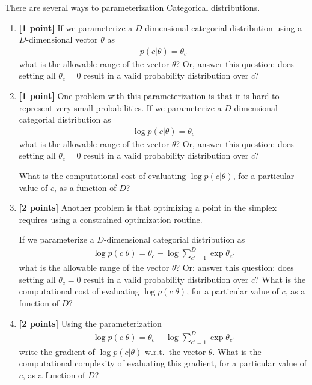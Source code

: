 \documentclass{harvardml}
\theoremstyle{plain}
\begin{document}
\begin{problem}

There are several ways to parameterization Categorical distributions.

\begin{enumerate}[label=(\alph*)]
\item {\bf [1 point]} If we parameterize a $D$-dimensional categorial distribution using a $D$-dimensional vector $\theta$ as
%
\begin{align}
p(c | \theta) = \theta_c
\end{align}
%
what is the allowable range of the vector $\theta$? Or, answer this question: does setting all $\theta_c = 0$ result in a valid probability distribution over $c$?

\item {\bf [1 point]} One problem with this parameterization is that it is hard to represent very small probabilities.
If we parameterize a $D$-dimensional categorial distribution as
%
\begin{align}
\log p(c | \theta) = \theta_c
\end{align}
%
what is the allowable range of the vector $\theta$? Or, answer this question: does setting all $\theta_c = 0$ result in a valid probability distribution over $c$?

What is the computational cost of evaluating $\log p(c | \theta)$, for a particular value of $c$, as a function of $D$?

\item {\bf [2 points]} Another problem is that optimizing a point in the simplex requires using a constrained optimization routine.

If we parameterize a $D$-dimensional categorial distribution as
%
\begin{align}
\log p(c | \theta) = \theta_c - \log \sum_{c' = 1}^D \exp \theta_{c'}
\end{align}
%
what is the allowable range of the vector $\theta$? Or: answer this question: does setting all $\theta_c = 0$ result in a valid probability distribution over $c$?
What is the computational cost of evaluating $\log p(c | \theta)$, for a particular value of $c$, as a function of $D$?

\item {\bf [2 points]} Using the parameterization
%
\begin{align}
\log p(c | \theta) = \theta_c - \log \sum_{c' = 1}^D \exp \theta_{c'}
\end{align}
%
write the gradient of $\log p(c | \theta)$ w.r.t.\ the vector $\theta$.
What is the computational complexity of evaluating this gradient, for a particular value of $c$, as a function of $D$?


\end{enumerate}
\end{problem}
\end{document}
